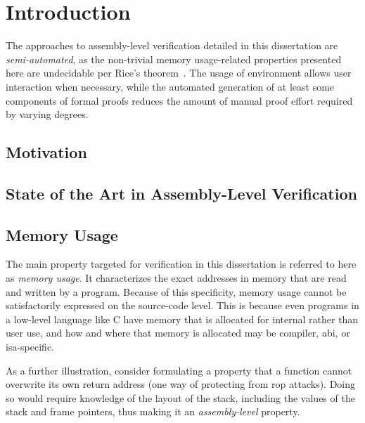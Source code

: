 \chapter{Introduction}


The approaches to assembly-level verification detailed in this dissertation%
are \emph{semi-automated},
as the non-trivial memory usage-related properties presented here are undecidable
per Rice's theorem~\citep{rice1953classes}.
The usage of  environment allows user interaction when necessary,
while the automated generation
of at least some components of formal proofs
reduces the amount of manual proof effort required by varying degrees.

\section{Motivation}

\section{State of the Art in Assembly-Level Verification}

\section{Memory Usage}\label{memory_usage}
The main property targeted for verification in this dissertation
is referred to here as \emph{memory usage}.%
It characterizes the exact addresses in memory
that are read and written by a program.
Because of this specificity, memory usage cannot be satisfactorily expressed
on the source-code level.
This is because even programs in a low-level language like C
have memory that is allocated for internal rather than user use,
and how and where that memory is allocated may be compiler, \ac{abi},
or \ac{isa}-specific.

As a further illustration,
consider formulating a property
that a function cannot overwrite its own return address
(one way of protecting from \ac{rop} attacks).
Doing so would require knowledge of the layout of the stack,
including the values of the stack and frame pointers,
thus making it an \emph{assembly-level} property.

